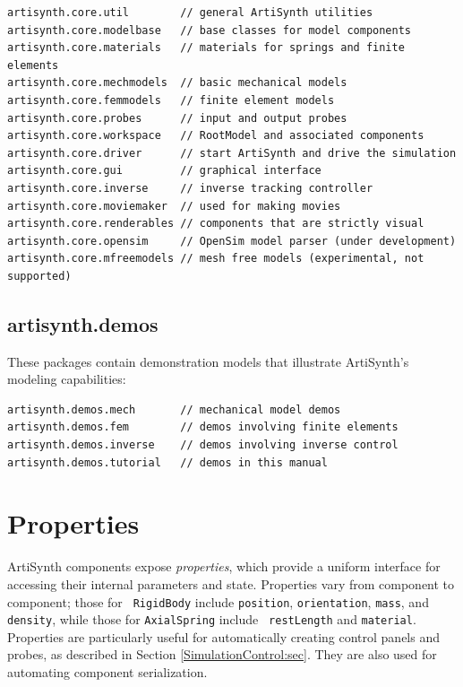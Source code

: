 \begin{lstlisting}[]
artisynth.core.util        // general ArtiSynth utilities
artisynth.core.modelbase   // base classes for model components
artisynth.core.materials   // materials for springs and finite elements
artisynth.core.mechmodels  // basic mechanical models
artisynth.core.femmodels   // finite element models
artisynth.core.probes      // input and output probes
artisynth.core.workspace   // RootModel and associated components
artisynth.core.driver      // start ArtiSynth and drive the simulation
artisynth.core.gui         // graphical interface
artisynth.core.inverse     // inverse tracking controller
artisynth.core.moviemaker  // used for making movies
artisynth.core.renderables // components that are strictly visual
artisynth.core.opensim     // OpenSim model parser (under development)
artisynth.core.mfreemodels // mesh free models (experimental, not supported)
\end{lstlisting}

\subsection{artisynth.demos}

These packages contain demonstration models that illustrate
ArtiSynth's modeling capabilities:

\begin{lstlisting}[]
artisynth.demos.mech       // mechanical model demos
artisynth.demos.fem        // demos involving finite elements
artisynth.demos.inverse    // demos involving inverse control
artisynth.demos.tutorial   // demos in this manual
\end{lstlisting}

\section{Properties}
\label{Properties:sec}

ArtiSynth components expose {\it properties}, which provide a uniform
interface for accessing their internal parameters and
state. Properties vary from component to component; those for {\tt
RigidBody} include {\tt position}, {\tt orientation}, {\tt mass}, and
{\tt density}, while those for {\tt AxialSpring} include {\tt
restLength} and {\tt material}. Properties are particularly
useful for automatically creating control panels and
probes, as described in Section \ref{SimulationControl:sec}.
They are also used for automating component serialization.

